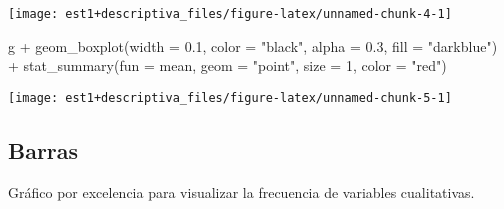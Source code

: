 \documentclass[
]{book}
\newenvironment{Shaded}{\begin{snugshade}}{\end{snugshade}}
\newcommand{\AttributeTok}[1]{\textcolor[rgb]{0.77,0.63,0.00}{#1}}
\newcommand{\DecValTok}[1]{\textcolor[rgb]{0.00,0.00,0.81}{#1}}
\newcommand{\FloatTok}[1]{\textcolor[rgb]{0.00,0.00,0.81}{#1}}
\newcommand{\FunctionTok}[1]{\textcolor[rgb]{0.00,0.00,0.00}{#1}}
\newcommand{\NormalTok}[1]{#1}
\newcommand{\OtherTok}[1]{\textcolor[rgb]{0.56,0.35,0.01}{#1}}
\newcommand{\SpecialCharTok}[1]{\textcolor[rgb]{0.00,0.00,0.00}{#1}}
\newcommand{\StringTok}[1]{\textcolor[rgb]{0.31,0.60,0.02}{#1}}
\begin{document}
\begin{center}\texttt{[image: est1+descriptiva\_files/figure-latex/unnamed-chunk-4-1]} \end{center}

\begin{Shaded}
\begin{Highlighting}[]
\NormalTok{g }\SpecialCharTok{+} \FunctionTok{geom\_boxplot}\NormalTok{(}\AttributeTok{width =} \FloatTok{0.1}\NormalTok{, }\AttributeTok{color =} \StringTok{"black"}\NormalTok{,}
                 \AttributeTok{alpha =} \FloatTok{0.3}\NormalTok{, }\AttributeTok{fill =} \StringTok{"darkblue"}\NormalTok{)  }\SpecialCharTok{+}
  \FunctionTok{stat\_summary}\NormalTok{(}\AttributeTok{fun =}\NormalTok{ mean, }\AttributeTok{geom =} \StringTok{"point"}\NormalTok{,}
               \AttributeTok{size =} \DecValTok{1}\NormalTok{, }\AttributeTok{color =} \StringTok{"red"}\NormalTok{)}
\end{Highlighting}
\end{Shaded}

\begin{center}\texttt{[image: est1+descriptiva\_files/figure-latex/unnamed-chunk-5-1]} \end{center}

\hypertarget{barras}{%
\subsection{Barras}\label{barras}}

Gráfico por excelencia para visualizar la frecuencia de variables cualitativas.

\begin{Shaded}
\end{Shaded}
\end{document}
